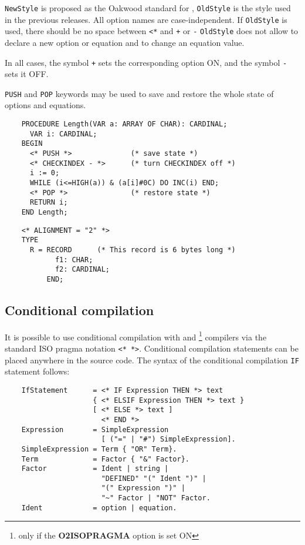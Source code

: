 {\tt NewStyle} is proposed as the Oakwood standard for \ot{},
{\tt OldStyle} is the style used in the previous \xds{} releases.  All
option names are case-independent.  If {\tt OldStyle} is used, 
there should be  no  space between \verb|<*| and \verb|+| or \verb|-|
{\tt OldStyle} does not allow to declare a new option or equation
and to change an equation value.

In all cases, the symbol \verb|+| sets the corresponding
option ON, and the symbol \verb|-| sets it OFF.

{\tt PUSH} and {\tt POP} keywords may be used to save and restore
the whole state of options and equations.

\Examples
\begin{verbatim}
    PROCEDURE Length(VAR a: ARRAY OF CHAR): CARDINAL;
      VAR i: CARDINAL;
    BEGIN
      <* PUSH *>              (* save state *)
      <* CHECKINDEX - *>      (* turn CHECKINDEX off *)
      i := 0;
      WHILE (i<=HIGH(a)) & (a[i]#0C) DO INC(i) END;
      <* POP *>               (* restore state *)
      RETURN i;
    END Length;
\end{verbatim}
\begin{verbatim}
    <* ALIGNMENT = "2" *>
    TYPE
      R = RECORD      (* This record is 6 bytes long *)
            f1: CHAR;
            f2: CARDINAL;
          END;
\end{verbatim}

\subsection{Conditional compilation}\label{m2:pragmas:cc}

It is possible to use conditional compilation with \mt{} and
\ot{}\footnote{only if the {\bf O2ISOPRAGMA} option is set ON}
compilers via the standard ISO pragma notation \verb|<* *>|.
Conditional compilation statements can be placed anywhere in the source
code. The syntax of the conditional compilation \verb'IF' statement
follows:
\begin{verbatim}
    IfStatement      = <* IF Expression THEN *> text
                     { <* ELSIF Expression THEN *> text }
                     [ <* ELSE *> text ]
                       <* END *>
    Expression       = SimpleExpression
                       [ ("=" | "#") SimpleExpression].
    SimpleExpression = Term { "OR" Term}.
    Term             = Factor { "&" Factor}.
    Factor           = Ident | string |
                       "DEFINED" "(" Ident ")" |
                       "(" Expression ")" |
                       "~" Factor | "NOT" Factor.
    Ident            = option | equation.
\end{verbatim}

